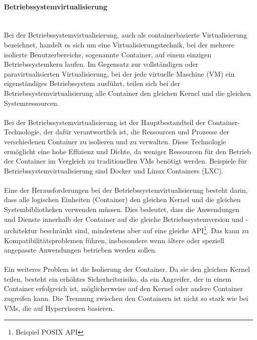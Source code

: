 \documentclass[../vs-script-first-v01.tex]{subfiles}
\begin{document}
\paragraph{Betriebssystemvirtualisierung\\\\}
Bei der Betriebssystemvirtualisierung, auch als containerbasierte Virtualisierung bezeichnet, handelt es sich um eine Virtualisierungstechnik, bei der mehrere isolierte Benutzerbereiche, sogenannte Container, auf einem einzigen Betriebssystemkern laufen. Im Gegensatz zur vollständigen oder paravirtualisierten Virtualisierung, bei der jede virtuelle Maschine (VM) ein eigenständiges Betriebssystem ausführt, teilen sich bei der Betriebssystemvirtualisierung alle Container den gleichen Kernel und die gleichen Systemressourcen.
\\\\
Bei der Betriebssystemvirtualisierung ist der Hauptbestandteil der Container-Technologie, der dafür verantwortlich ist, die Ressourcen und Prozesse der verschiedenen Container zu isolieren und zu verwalten. Diese Technologie ermöglicht eine hohe Effizienz und Dichte, da weniger Ressourcen für den Betrieb der Container im Vergleich zu traditionellen VMs benötigt werden. Beispiele für Betriebssystemvirtualisierung sind Docker und Linux Containers (LXC).
\\\\
Eine der Herausforderungen bei der Betriebssystemvirtualisierung besteht darin, dass alle logischen Einheiten (Container) den gleichen Kernel und die gleichen Systembibliotheken verwenden müssen. Dies bedeutet, dass die Anwendungen und Dienste innerhalb der Container auf die gleiche Betriebssystemversion und -architektur beschränkt sind, mindestens aber auf eine gleiche API\footnote{Beispiel POSIX API}. Das kann zu Kompatibilitätsproblemen führen, insbesondere wenn ältere oder speziell angepasste Anwendungen betrieben werden sollen.
\\\\
Ein weiteres Problem ist die Isolierung der Container. Da sie den gleichen Kernel teilen, besteht ein erhöhtes Sicherheitsrisiko, da ein Angreifer, der in einem Container erfolgreich ist, möglicherweise auf den Kernel oder andere Container zugreifen kann. Die Trennung zwischen den Containern ist nicht so stark wie bei VMs, die auf Hypervisoren basieren.
\end{document}
